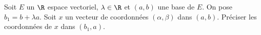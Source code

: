 Soit $E$ un $\R$ espace vectoriel, $\lambda \in \R$ et $(a,b)$ une base de $E$. On pose $b_1=b+\lambda a$. Soit $x$ un vecteur de coordonn\'ees $(\alpha, \beta)$ dans $(a,b)$. Pr{\'e}ciser les coordonn\'ees de $x$ dans $(b_1,a)$.\bigskip